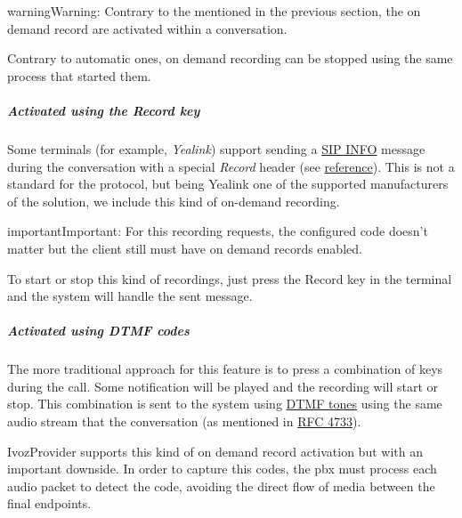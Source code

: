 \documentclass[letterpaper,10pt,english]{sphinxmanual}
\begin{document}
\begin{notice}{warning}{Warning:}
Contrary to the {\hyperref[administration_portal/platform/services:services]{}} mentioned in the
previous section, the on demand record are activated within a conversation.
\end{notice}

Contrary to automatic ones, on demand recording can be stopped using the same
process that started them.


\subparagraph{Activated using the \emph{Record} key}
\label{administration_portal/client/residential/calls/call_recordings:activated-using-the-record-key}
Some terminals (for example, \emph{Yealink}) support sending a \href{https://tools.ietf.org/html/rfc6086}{SIP INFO} message during the conversation with a
special \emph{Record} header (see \href{http://www.yealink.com/Upload/document/UsingCallRecordingFeatureonYealinkPhones/UsingCallRecordingFeatureonYealinkSIPT2XPphonesRev\_610-20561729764.pdf}{reference}).
This is not a standard for the protocol, but being Yealink one of the supported
manufacturers of the solution, we include this kind of on-demand recording.

\begin{notice}{important}{Important:}
For this recording requests, the configured code doesn't matter
but the client still must have on demand records enabled.
\end{notice}

To start or stop this kind of recordings, just press the Record key in the
terminal and the system will handle the sent message.


\subparagraph{Activated using \emph{DTMF} codes}
\label{administration_portal/client/residential/calls/call_recordings:activated-using-dtmf-codes}
The more traditional approach for this feature is to press a combination of
keys during the call. Some notification will be played and the recording will
start or stop. This combination is sent to the system using \href{https://es.wikipedia.org/wiki/Marcaci\%C3\%B3n\_por\_tonos}{DTMF tones} using the same audio
stream that the conversation (as mentioned in \href{https://tools.ietf.org/html/rfc4733}{RFC 4733}).

IvozProvider supports this kind of on demand record activation but with an
important downside. In order to capture this codes, the pbx must process each
audio packet to detect the code, avoiding the direct flow of media between the
final endpoints.
\end{document}
